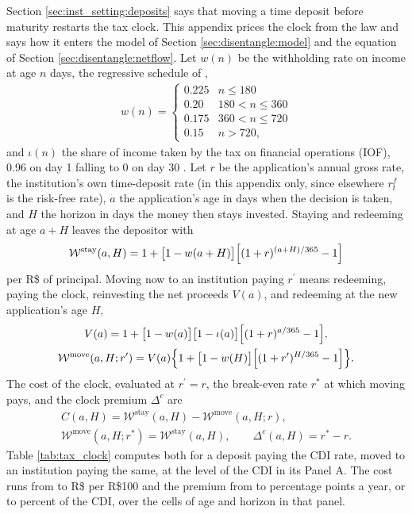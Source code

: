 Section \ref{sec:inst_setting:deposits} says that moving a time deposit before maturity restarts the tax clock. This appendix prices the clock from the law and says how it enters the model of Section \ref{sec:disentangle:model} and the equation of Section \ref{sec:disentangle:netflow}. Let $w(n)$ be the withholding rate on income at age $n$ days, the regressive schedule of \textcite{brasil_lei11033_2004},
\begin{gather}
	w(n)=\begin{cases}0.225 & n\le 180\\ 0.20 & 180<n\le 360\\ 0.175 & 360<n\le 720\\ 0.15 & n>720,\end{cases} \label{eq:app_tau}
\end{gather}
and $\iota(n)$ the share of income taken by the tax on financial operations (IOF), 0.96 on day 1 falling to 0 on day 30 \parencite{brasil_decreto6306_2007}. Let $r$ be the application's annual gross rate, the institution's own time-deposit rate (in this appendix only, since elsewhere $r_t^f$ is the risk-free rate), $a$ the application's age in days when the decision is taken, and $H$ the horizon in days the money then stays invested. Staying and redeeming at age $a+H$ leaves the depositor with
\begin{gather}
	\mathcal{W}^{\mathrm{stay}}(a,H)=1+\bigl[1-w(a+H)\bigr]\Bigl[(1+r)^{(a+H)/365}-1\Bigr] \label{eq:app_Ws}
\end{gather}
per R\$ of principal. Moving now to an institution paying $r^\prime$ means redeeming, paying the clock, reinvesting the net proceeds $V(a)$, and redeeming at the new application's age $H$,
\begin{gather}
	V(a)=1+\bigl[1-w(a)\bigr]\bigl[1-\iota(a)\bigr]\Bigl[(1+r)^{a/365}-1\Bigr], \label{eq:app_P} \\
	\mathcal{W}^{\mathrm{move}}(a,H;r^\prime)=V(a)\Bigl\{1+\bigl[1-w(H)\bigr]\Bigl[(1+r^\prime)^{H/365}-1\Bigr]\Bigr\}. \label{eq:app_Wm}
\end{gather}
The cost of the clock, evaluated at $r^\prime=r$, the break-even rate $r^{*}$ at which moving pays, and the clock premium $\Delta^{c}$ are
\begin{gather}
	C(a,H)=\mathcal{W}^{\mathrm{stay}}(a,H)-\mathcal{W}^{\mathrm{move}}(a,H;r), \nonumber \\
	\mathcal{W}^{\mathrm{move}}(a,H;r^{*})=\mathcal{W}^{\mathrm{stay}}(a,H), \qquad \Delta^{c}(a,H)=r^{*}-r. \label{eq:app_cost}
\end{gather}
Table \ref{tab:tax_clock} computes both for a deposit paying the CDI rate, moved to an institution paying the same, at the level of the CDI in its Panel A. The cost runs from  to  R\$ per R\$100 and the premium from  to  percentage points a year, or  to  percent of the CDI, over the cells of age and horizon in that panel.

